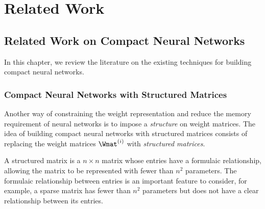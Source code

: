 \chapter{Related Work}
\label{chapter:p1-ch3-related_work}
\localtableofcontents
\vspace{\marginbellowtable}



\section{Related Work on Compact Neural Networks}
\label{section:ch3-related_work_on_compact_neural_networks}

In this chapter, we review the literature on the existing techniques for building compact neural networks.


\subsection{Compact Neural Networks with Structured Matrices}
\label{subsection:ch3-compact_neural_networks_with_structured_matrices}

Another way of constraining the weight representation and reduce the memory requirement of neural networks is to impose a \emph{structure} on weight matrices. 
The idea of building compact neural networks with structured matrices consists of replacing the weight matrices $\Wmat^{(i)}$ with \emph{structured matrices}.


A structured matrix is a $n \times n$ matrix whose entries have a formulaic relationship, allowing the matrix to be represented with fewer than $n^2$ parameters.
The formulaic relationship between entries is an important feature to consider, for example, a sparse matrix has fewer than $n^2$ parameters but does not have a clear relationship between its entries.


